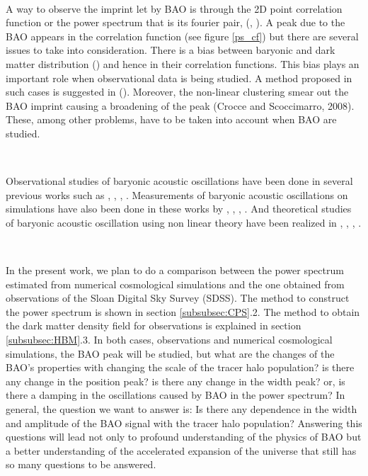 \documentclass[a4,useAMS,usegraphicx,12pt]{article}
\begin{document}
\	

A way to observe the imprint let by BAO is through the 2D point correlation function or the power spectrum that is 
its fourier pair, (\cite{PLOT}, \cite{PLOT2}).  A peak due to the BAO appears in the correlation function (see figure \ref{ps_cf}) but there are 
several issues to take into consideration.
There is a bias between baryonic and dark matter distribution (\cite{Biases}) and hence in their correlation functions. This bias  
plays an important role when observational data 
is being studied. A method proposed in such cases is suggested in (\cite{HBM}). 
Moreover, the non-linear clustering smear out the BAO imprint causing a broadening of the peak (Crocce
and Scoccimarro, 2008). These, among other 
problems, have to be taken into account when BAO are studied. 

\

Observational studies of baryonic acoustic oscillations have been done in several previous works such 
as \cite{Obs01}, \cite{Obs02}, \cite{Obs03}, \cite{Obs04} . Measurements of baryonic acoustic oscillations on simulations 
have also been done in these works by \cite{Sim01}, \cite{Sim02}, \cite{Sim03}, \cite{Sim04}.
And theoretical studies of baryonic acoustic oscillation using non linear theory have been realized in \cite{Theo01}, \cite{Theo02},
\cite{Theo03}, \cite{last} .  

\

In the present work, we plan to do a comparison between the power spectrum estimated from numerical cosmological simulations
and the one obtained from observations of the Sloan Digital Sky Survey (SDSS). The method to construct the power spectrum
is shown in section \ref{subsubsec:CPS}.2. The method to obtain the dark matter density field for observations is 
explained in section \ref{subsubsec:HBM}.3. In both cases, observations and numerical cosmological simulations, the BAO 
peak will be studied, but what are the changes of the BAO's properties with changing the scale of the tracer halo population?
is there any change in the position peak? is there any change in the width peak? or, is there a damping in the oscillations
caused by BAO in the power spectrum? In general, the question we want to answer is: Is there any dependence in the width 
and amplitude of the BAO signal with the tracer halo population?
Answering this questions will lead not only to profound understanding of the physics of
BAO but a better understanding of the accelerated expansion of the universe that still has so many questions to be answered. 
\end{document}
